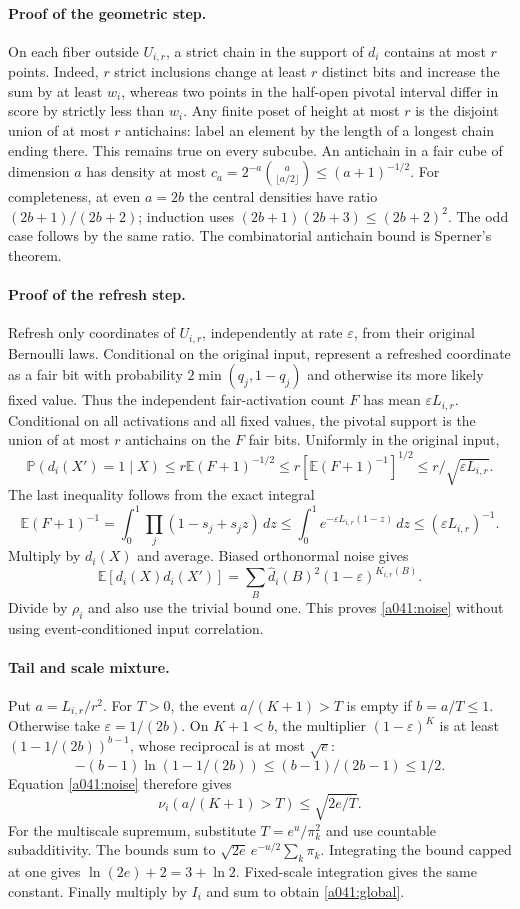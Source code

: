 \paragraph{Proof of the geometric step.}
On each fiber outside $U_{i,r}$, a strict chain in the support of $d_i$
contains at most $r$ points. Indeed, $r$ strict inclusions change at
least $r$ distinct bits and increase the sum by at least $w_i$, whereas
two points in the half-open pivotal interval differ in score by strictly
less than $w_i$. Any finite poset of height at most $r$ is the disjoint
union of at most $r$ antichains: label an element by the length of a
longest chain ending there. This remains true on every subcube.
An antichain in a fair cube of dimension $a$ has density at most
$c_a=2^{-a}\binom{a}{\lfloor a/2\rfloor}\le(a+1)^{-1/2}$.
For completeness, at even $a=2b$ the central densities have ratio
$(2b+1)/(2b+2)$; induction uses
$(2b+1)(2b+3)\le(2b+2)^2$. The odd case follows by the same ratio.
The combinatorial antichain bound is Sperner's theorem.

\paragraph{Proof of the refresh step.}
Refresh only coordinates of $U_{i,r}$, independently at rate
$\varepsilon$, from their original Bernoulli laws. Conditional on the
original input, represent a refreshed coordinate as a fair bit with
probability $2\min(q_j,1-q_j)$ and otherwise its more likely fixed
value. Thus the independent fair-activation count $F$ has mean
$\varepsilon L_{i,r}$. Conditional on all activations and all fixed
values, the pivotal support is the union of at most $r$ antichains on
the $F$ fair bits. Uniformly in the original input,
\[
 \mathbb P(d_i(X')=1\mid X)\le r\mathbb E(F+1)^{-1/2}
 \le r[\mathbb E(F+1)^{-1}]^{1/2}
 \le r/\sqrt{\varepsilon L_{i,r}}.
\]
The last inequality follows from the exact integral
\[
 \mathbb E(F+1)^{-1}=\int_0^1\prod_j(1-s_j+s_jz)\,dz
 \le\int_0^1e^{-\varepsilon L_{i,r}(1-z)}\,dz
 \le(\varepsilon L_{i,r})^{-1}.
\]
Multiply by $d_i(X)$ and average. Biased orthonormal noise gives
\[
 \mathbb E[d_i(X)d_i(X')]
 =\sum_B\widehat d_i(B)^2(1-\varepsilon)^{K_{i,r}(B)}.
\]
Divide by $\rho_i$ and also use the trivial bound one. This proves
\eqref{a041:noise} without using event-conditioned input correlation.

\paragraph{Tail and scale mixture.}
Put $a=L_{i,r}/r^2$. For $T>0$, the event $a/(K+1)>T$ is empty
if $b=a/T\le1$. Otherwise take $\varepsilon=1/(2b)$.
On $K+1<b$, the multiplier $(1-\varepsilon)^K$ is at least
$(1-1/(2b))^{b-1}$, whose reciprocal is at most $\sqrt e$:
\[
 -(b-1)\ln(1-1/(2b))\le(b-1)/(2b-1)\le1/2.
\]
Equation \eqref{a041:noise} therefore gives
\[
 \nu_i(a/(K+1)>T)\le\sqrt{2e/T}.
\]
For the multiscale supremum, substitute $T=e^u/\pi_k^2$ and
use countable subadditivity. The bounds sum to
$\sqrt{2e}\,e^{-u/2}\sum_k\pi_k$. Integrating the bound capped at
one gives
$\ln(2e)+2=3+\ln2$. Fixed-scale integration gives the same constant.
Finally multiply by $I_i$ and sum to obtain \eqref{a041:global}.

